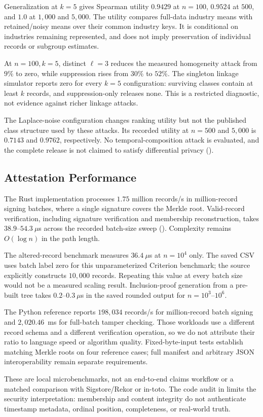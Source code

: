 Generalization at $k=5$ gives Spearman utility $0.9429$ at $n=100$, $0.9524$ at $500$, and $1.0$ at $1{,}000$ and $5{,}000$. The utility compares full-data industry means with retained/noisy means over their common industry keys. It is conditional on industries remaining represented, and does not imply preservation of individual records or subgroup estimates.

At $n=100,k=5$, distinct $\ell=3$ reduces the measured homogeneity attack from $9\%$ to zero, while suppression rises from $30\%$ to $52\%$. The singleton linkage simulator reports zero for every $k=5$ configuration: surviving classes contain at least $k$ records, and suppression-only releases none. This is a restricted diagnostic, not evidence against richer linkage attacks.

The Laplace-noise configuration changes ranking utility but not the published class structure used by these attacks. Its recorded utility at $n=500$ and $5{,}000$ is $0.7143$ and $0.9762$, respectively. No temporal-composition attack is evaluated, and the complete release is not claimed to satisfy differential privacy ().



\subsection{Attestation Performance}
\label{sec:res-ex3}
The Rust implementation processes $1.75$ million records/s in million-record signing batches, where a single signature covers the Merkle root. Valid-record verification, including signature verification and membership reconstruction, takes $38.9$--$54.3~\mu$s across the recorded batch-size sweep (). Complexity remains $O(\log n)$ in the path length.

The altered-record benchmark measures $36.4~\mu$s at $n=10^4$ only. The saved CSV uses batch label zero for this unparameterized Criterion benchmark; the source explicitly constructs $10{,}000$ records. Repeating this value at every batch size would not be a measured scaling result. Inclusion-proof generation from a pre-built tree takes $0.2$--$0.3~\mu$s in the saved rounded output for $n=10^3$--$10^6$.

The Python reference reports $198{,}034$ records/s for million-record batch signing and $2{,}020.46$~ms for full-batch tamper checking. Those workloads use a different record schema and a different verification operation, so we do not attribute their ratio to language speed or algorithm quality. Fixed-byte-input tests establish matching Merkle roots on four reference cases; full manifest and arbitrary JSON interoperability remain separate requirements.



These are local microbenchmarks, not an end-to-end claims workflow or a matched comparison with Sigstore/Rekor or in-toto. The code audit in  limits the security interpretation: membership and content integrity do not authenticate timestamp metadata, ordinal position, completeness, or real-world truth.
